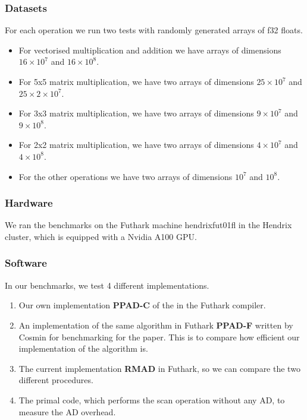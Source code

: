 \documentclass{article}
\begin{document}
\subsubsection*{Datasets}
For each operation we run two tests with randomly generated arrays of f32
floats.
\begin{itemize}
	\item For vectorised multiplication and addition we have arrays of
	      dimensions \(16 \times 10^{7}\) and \(16 \times 10^{8}\).
	\item For 5x5 matrix multiplication, we have two arrays of dimensions \(25 \times 10^{7}\)
	      and \(25 \times 2 \times 10^{7}\).
	\item For 3x3 matrix multiplication, we have two arrays of dimensions \(9 \times 10^{7}\)
	      and \(9 \times 10^{8}\).
	\item For 2x2 matrix multiplication, we have two arrays of dimensions \(4 \times 10^{7}\)
	      and \(4 \times 10^{8}\).
	\item For the other operations we have two arrays of dimensions
	      \(10^{7}\) and \(10^{8}\).
\end{itemize}
\subsubsection*{Hardware}
We ran the benchmarks on the Futhark machine hendrixfut01fl in the Hendrix
cluster,
which is equipped with a Nvidia A100 GPU.
\subsubsection*{Software}
In our benchmarks, we test 4 different implementations.
\begin{enumerate}
	\item Our own implementation \textbf{PPAD-C} of the \cite{PPAD} in the Futhark compiler.
	\item An implementation of the same algorithm in Futhark \textbf{PPAD-F} written by Cosmin
	      for benchmarking for the \cite{Futhark} paper.
	      This is to compare how efficient our implementation of the algorithm is.
	\item The current implementation \textbf{RMAD} in Futhark,
	      so we can compare the two different procedures.
	\item The primal code, which performs the scan operation without any AD,
	      to measure the AD overhead.

\end{enumerate}
\end{document}
